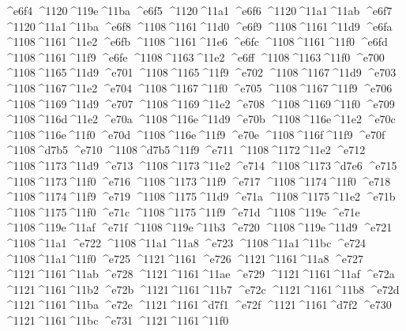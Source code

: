 \checkit ^^^^e6f4 ^^^^1120^^^^119e^^^^11ba
\checkit ^^^^e6f5 ^^^^1120^^^^11a1
\checkit ^^^^e6f6 ^^^^1120^^^^11a1^^^^11ab
\checkit ^^^^e6f7 ^^^^1120^^^^11a1^^^^11ba
\checkit ^^^^e6f8 ^^^^1108^^^^1161^^^^11d0
\checkit ^^^^e6f9 ^^^^1108^^^^1161^^^^11d9
\checkit ^^^^e6fa ^^^^1108^^^^1161^^^^11e2
\checkit ^^^^e6fb ^^^^1108^^^^1161^^^^11e6
\checkit ^^^^e6fc ^^^^1108^^^^1161^^^^11f0
\checkit ^^^^e6fd ^^^^1108^^^^1161^^^^11f9
\checkit ^^^^e6fe ^^^^1108^^^^1163^^^^11e2
\checkit ^^^^e6ff ^^^^1108^^^^1163^^^^11f0
\checkit ^^^^e700 ^^^^1108^^^^1165^^^^11d9
\checkit ^^^^e701 ^^^^1108^^^^1165^^^^11f9
\checkit ^^^^e702 ^^^^1108^^^^1167^^^^11d9
\checkit ^^^^e703 ^^^^1108^^^^1167^^^^11e2
\checkit ^^^^e704 ^^^^1108^^^^1167^^^^11f0
\checkit ^^^^e705 ^^^^1108^^^^1167^^^^11f9
\checkit ^^^^e706 ^^^^1108^^^^1169^^^^11d9
\checkit ^^^^e707 ^^^^1108^^^^1169^^^^11e2
\checkit ^^^^e708 ^^^^1108^^^^1169^^^^11f0
\checkit ^^^^e709 ^^^^1108^^^^116d^^^^11e2
\checkit ^^^^e70a ^^^^1108^^^^116e^^^^11d9
\checkit ^^^^e70b ^^^^1108^^^^116e^^^^11e2
\checkit ^^^^e70c ^^^^1108^^^^116e^^^^11f0
\checkit ^^^^e70d ^^^^1108^^^^116e^^^^11f9
\checkit ^^^^e70e ^^^^1108^^^^116f^^^^11f9
\checkit ^^^^e70f ^^^^1108^^^^d7b5
\checkit ^^^^e710 ^^^^1108^^^^d7b5^^^^11f9
\checkit ^^^^e711 ^^^^1108^^^^1172^^^^11e2
\checkit ^^^^e712 ^^^^1108^^^^1173^^^^11d9
\checkit ^^^^e713 ^^^^1108^^^^1173^^^^11e2
\checkit ^^^^e714 ^^^^1108^^^^1173^^^^d7e6
\checkit ^^^^e715 ^^^^1108^^^^1173^^^^11f0
\checkit ^^^^e716 ^^^^1108^^^^1173^^^^11f9
\checkit ^^^^e717 ^^^^1108^^^^1174^^^^11f0
\checkit ^^^^e718 ^^^^1108^^^^1174^^^^11f9
\checkit ^^^^e719 ^^^^1108^^^^1175^^^^11d9
\checkit ^^^^e71a ^^^^1108^^^^1175^^^^11e2
\checkit ^^^^e71b ^^^^1108^^^^1175^^^^11f0
\checkit ^^^^e71c ^^^^1108^^^^1175^^^^11f9
\checkit ^^^^e71d ^^^^1108^^^^119e
\checkit ^^^^e71e ^^^^1108^^^^119e^^^^11af
\checkit ^^^^e71f ^^^^1108^^^^119e^^^^11b3
\checkit ^^^^e720 ^^^^1108^^^^119e^^^^11d9
\checkit ^^^^e721 ^^^^1108^^^^11a1
\checkit ^^^^e722 ^^^^1108^^^^11a1^^^^11a8
\checkit ^^^^e723 ^^^^1108^^^^11a1^^^^11bc
\checkit ^^^^e724 ^^^^1108^^^^11a1^^^^11f0
\checkit ^^^^e725 ^^^^1121^^^^1161
\checkit ^^^^e726 ^^^^1121^^^^1161^^^^11a8
\checkit ^^^^e727 ^^^^1121^^^^1161^^^^11ab
\checkit ^^^^e728 ^^^^1121^^^^1161^^^^11ae
\checkit ^^^^e729 ^^^^1121^^^^1161^^^^11af
\checkit ^^^^e72a ^^^^1121^^^^1161^^^^11b2
\checkit ^^^^e72b ^^^^1121^^^^1161^^^^11b7
\checkit ^^^^e72c ^^^^1121^^^^1161^^^^11b8
\checkit ^^^^e72d ^^^^1121^^^^1161^^^^11ba
\checkit ^^^^e72e ^^^^1121^^^^1161^^^^d7f1
\checkit ^^^^e72f ^^^^1121^^^^1161^^^^d7f2
\checkit ^^^^e730 ^^^^1121^^^^1161^^^^11bc
\checkit ^^^^e731 ^^^^1121^^^^1161^^^^11f0

